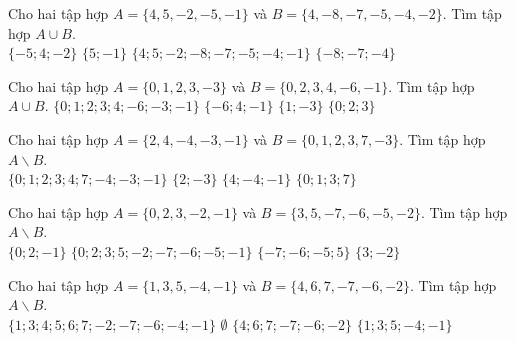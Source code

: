 \begin{ex}
 Cho hai tập hợp $A=\{{4, 5, -2, -5, -1}\}$ và $B=\{{4, -8, -7, -5, -4, -2}\}$. Tìm tập hợp $A\cup B$. \\ 
\choice
{ $\{{-5; 4; -2}\}$ }
   { $\{{5; -1}\}$ }
     { \True $\{{4; 5; -2; -8; -7; -5; -4; -1}\}$ }
    { $\{{-8; -7; -4}\}$ }
\loigiai{ 
  
 }\end{ex}

\begin{ex}Cho hai tập hợp $A=\{{0, 1, 2, 3, -3}\}$ và $B=\{{0, 2, 3, 4, -6, -1}\}$. Tìm tập hợp $A\cup B$.
\choice
{\True $\{{0; 1; 2; 3; 4; -6; -3; -1}\}$}
   {$\{{-6; 4; -1}\}$}
     {$\{{1; -3}\}$}
    {$\{{0; 2; 3}\}$}
\end{ex}

\begin{ex}
 Cho hai tập hợp $A=\{{2, 4, -4, -3, -1}\}$ và $B=\{{0, 1, 2, 3, 7, -3}\}$. Tìm tập hợp $A\backslash B$. \\ 
\choice
{ $\{{0; 1; 2; 3; 4; 7; -4; -3; -1}\}$ }
   { $\{{2; -3}\}$ }
     { \True $\{{4; -4; -1}\}$ }
    { $\{{0; 1; 3; 7}\}$ }
\loigiai{ 
  
 }\end{ex}

\begin{ex}
 Cho hai tập hợp $A=\{{0, 2, 3, -2, -1}\}$ và $B=\{{3, 5, -7, -6, -5, -2}\}$. Tìm tập hợp $A\backslash B$. \\ 
\choice
{ \True $\{{0; 2; -1}\}$ }
   { $\{{0; 2; 3; 5; -2; -7; -6; -5; -1}\}$ }
     { $\{{-7; -6; -5; 5}\}$ }
    { $\{{3; -2}\}$ }
\loigiai{ 
  
 }\end{ex}

\begin{ex}
 Cho hai tập hợp $A=\{{1, 3, 5, -4, -1}\}$ và $B=\{{4, 6, 7, -7, -6, -2}\}$. Tìm tập hợp $A\backslash B$. \\ 
\choice
{ $\{{1; 3; 4; 5; 6; 7; -2; -7; -6; -4; -1}\}$ }
   { $\emptyset$ }
     { $\{{4; 6; 7; -7; -6; -2}\}$ }
    { \True $\{{1; 3; 5; -4; -1}\}$ }
\loigiai{ 
  
 }\end{ex}

